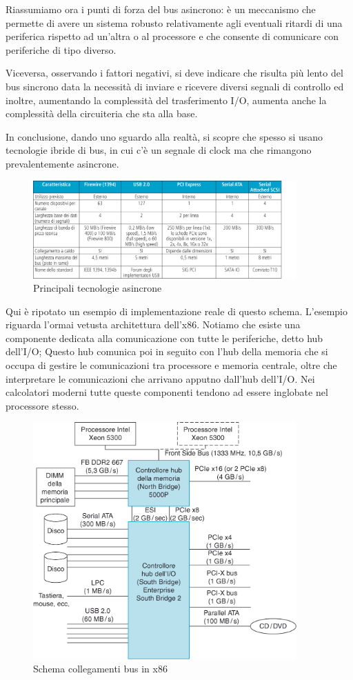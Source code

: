 \documentclass[class=book, crop=false, oneside]{standalone}
\begin{document}
Riassumiamo ora i punti di forza del bus asincrono: è un meccanismo che permette di avere un sistema robusto relativamente agli eventuali ritardi di una periferica rispetto ad un'altra o al processore e che consente di comunicare con periferiche di tipo diverso.

Viceversa, osservando i fattori negativi, si deve indicare che risulta più lento del bus sincrono data la necessità di inviare e ricevere diversi segnali di controllo ed inoltre, aumentando la complessità del trasferimento I/O, aumenta anche la complessità della circuiteria che sta alla base.

In conclusione, dando uno sguardo alla realtà, si scopre che spesso si usano tecnologie ibride di bus, in cui c'è un segnale di clock ma che rimangono prevalentemente asincrone.

\begin{figure}[!h]
	\centering
	\includegraphics[width=0.9\textwidth,keepaspectratio]{tecnologie-asincrone}
	\caption{Principali tecnologie asincrone}
\end{figure}
Qui è ripotato un esempio di implementazione reale di questo schema. L'esempio riguarda l'ormai vetusta architettura dell'x86. Notiamo che esiste una componente dedicata alla comunicazione con tutte le periferiche, detto hub dell'I/O; Questo hub comunica poi in seguito con l'hub della memoria che si occupa di gestire le comunicazioni tra processore e memoria centrale, oltre che interpretare le comunicazioni che arrivano apputno dall'hub dell'I/O.
Nei calcolatori moderni tutte queste componenti tendono ad essere inglobate nel processore stesso.
\begin{figure}[!h]
	\centering
	\includegraphics[width=0.9\textwidth,keepaspectratio]{esempio-x86}
	\caption{Schema collegamenti bus in x86}
\end{figure}
\end{document}
